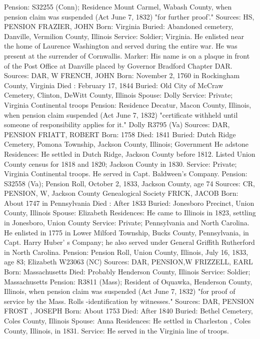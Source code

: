 Pension: S32255 (Conn); Residence Mount Carmel, Wabash County, when pension claim was suspended (Act June 7, 1832) "for further proof'." 
Sources: HS, PENSION 
FRAZIER, JOHN
Born: Virginia 
Buried: Abandoned cemetery, Danville, Vermilion County, Illinois 
Service: Soldier; Virginia. He enlisted near the home of Laurence Washington and served during the entire war. He was present at the surrender of Corn­wallis. 
Marker: His name is on a plaque in front of the Post Office at Danville placed by Governor Bradford Chapter DAR. 
Sources: DAR, W 
FRENCH, JOHN 
Born: November 2, 1760 in Rockingham County, Virginia 
Died : February 17, 1844 
Buried: Old City of McCraw Cemetery, Clinton, DeWitt County, Illinois 
Spouse: Dolly 
Service: Private; Virginia Continental troops Pension: 
Residence Decatur, Macon County, Illinois, when pension claim suspended (Act June 7, 1832) "certificate withheld until someone of responsibility applies for it." Dolly R3795 (Va) 
Sources: DAR, PENSION 
FRIATT, ROBERT 
Born: 1758 
Died: 1841 
Buried: Dutch Ridge Cemetery, Pomona Township, Jackson County, Illinois; Government He adstone Residences: He settled in Dutch Ridge, Jackson County before 1812. Listed Union County census for 1818 and 1820; Jackson County in 1830. 
Service: Private; Virginia Continental troops. He served in Capt. Baldween's Company. 
Pension: S32558 (Va); Pension Roll, October 2, 1833, Jackson County, age 74 
Sources: CR, PENSION, W, Jackson County Genealogical Society 
FRICK, JACOB 
Born: About 1747 in Pennsylvania 
Died : After 1833 
Buried: Jonesboro Precinct, Union County, Illinois 
Spouse: Elizabeth Residences: He came to Illinois in 1823, settling in Jonesboro, Union County Service: Private; Pennsylvania and North Carolina. He enlisted in 1775 in Lower Milford Township, Bucks County, Pennsylvania, in Capt. Harry Huber' s Company; he also served under General Griffith Rutherford in North Carolina. 
Pension: Pension Roll, Union County, Illinois, July 16, 1833, age 83; Elizabeth W23063 (NC) 
Sources: DAR, PENSION,W 
FRIZZELL, EARL 
Born: Massachusetts 
Died: Probably Henderson County, Illinois 
Service: Soldier; Massachusetts Pension: R3811 (Mass); Resident of Oquawka, Henderson County, Illinois, when 
pension claim was suspended (Act June 7, 1832) "for proof of service by the Mass. Rolls -identification by witnesses." 
Sources: DAR, PENSION 
FROST , JOSEPH 
Born: About 1753 
Died: After 1840 
Buried: Bethel Cemetery, Coles County, Illinois 
Spouse: Anna Residences: He settled in Charleston , Coles County, Illinois, in 1831. 
Service: He served in the Virginia line of troops. 
